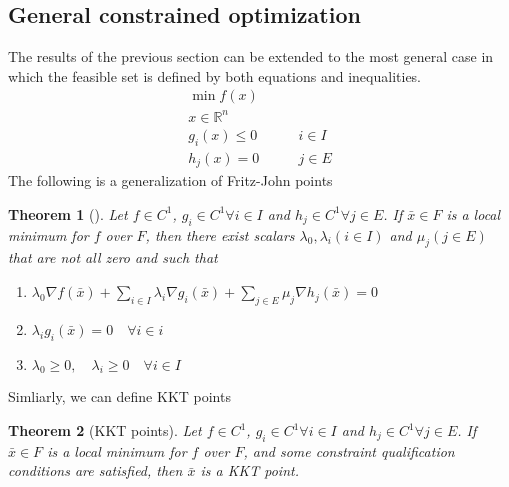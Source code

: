 \documentclass{book}
\newcommand{\R}{\mathbb{R}}
\theoremstyle{theoremv2}
\newtheorem{theorem}{Theorem}[chapter]
\theoremstyle{defv2}
\theoremstyle{remark}
\theoremstyle{remark}
\begin{document}
\subsection{General constrained optimization}
The results of the previous section can be extended to the most general case in which the feasible set is defined by both equations and inequalities.
\begin{align*}
    \min f(x)&\\
    x\in \R^n &\\
    g_i(x)\leq 0 & \qquad i\in I\\
    h_j(x)=0 & \qquad j\in E
\end{align*}
The following is a generalization of Fritz-John points
\begin{theorem}[]
    Let $f\in C^1$, $g_i\in C^1 \forall i\in I$ and $h_j\in C^1\forall j\in E$. If $\bar{x}\in F$ is a local minimum for $f$ over $F$, then there exist scalars $\lambda_0,\lambda_i(i\in I)$ and $\mu_j(j\in E)$ that are not all zero and such that 
    \begin{enumerate}
        \item $\lambda_0\nabla f(\bar{x}) + \sum_{i\in I}\lambda_i\nabla g_i(\bar{x}) + \sum_{j\in E}\mu_j \nabla h_j(\bar{x}) = 0$
        \item $\lambda_i g_i(\bar{x})=0 \quad \forall i \in i$
        \item $\lambda_0\geq 0, \quad \lambda_i \geq 0 \quad \forall i \in I$
    \end{enumerate}
\end{theorem}
Simliarly, we can define KKT points
\begin{theorem}[KKT points]
    Let $f\in C^1$, $g_i\in C^1 \forall i\in I$ and $h_j\in C^1\forall j\in E$. If $\bar{x}\in F$ is a local minimum for $f$ over $F$, and some constraint qualification conditions are satisfied, then $\bar{x}$ is a KKT point.
\end{theorem}
\end{document}
